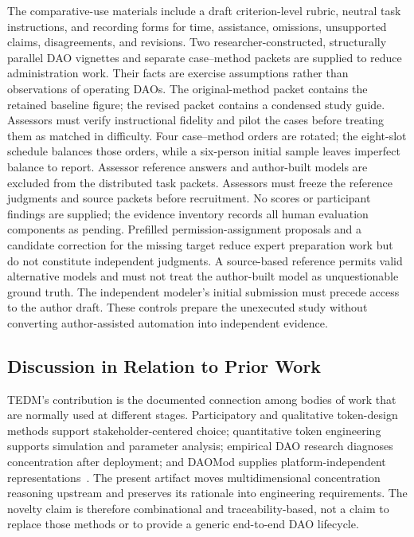 \documentclass[referee,sn-basic]{sn-jnl}
\begin{document}
The comparative-use materials include a draft criterion-level rubric, neutral
task instructions, and recording forms for time, assistance, omissions,
unsupported claims, disagreements, and revisions. Two researcher-constructed, structurally parallel DAO vignettes and separate
case--method packets are supplied to reduce administration work. Their facts
are exercise assumptions rather than observations of operating DAOs. The
original-method packet contains the retained baseline figure; the revised
packet contains a condensed study guide. Assessors must verify instructional
fidelity and pilot the cases before treating them as matched in difficulty.
Four case--method orders are rotated; the eight-slot schedule balances those
orders, while a six-person initial sample leaves imperfect balance to report.
Assessor reference answers and author-built models are excluded from the
distributed task packets. Assessors must freeze the
reference judgments and source packets before recruitment. No scores
or participant findings are supplied; the evidence inventory records all human
evaluation components as pending. Prefilled permission-assignment proposals
and a candidate correction for the missing target reduce expert preparation
work but do not constitute independent judgments. A source-based reference permits valid
alternative models and must not treat the author-built model as unquestionable
ground truth. The independent modeler's initial submission must precede access
to the author draft. These controls prepare the unexecuted study without
converting author-assisted automation into independent evidence.

\subsection{Discussion in Relation to Prior Work}
\label{subsec:evaluation-comparison}

TEDM's contribution is the documented connection among bodies of work that are
normally used at different stages. Participatory and qualitative token-design
methods support stakeholder-centered choice; quantitative token engineering
supports simulation and parameter analysis; empirical DAO research diagnoses
concentration after deployment; and DAOMod supplies platform-independent
representations~\cite{Domenicale2026Tokenomics,Sadykhov2025DeTEcT,
Fritsch2024VotingPower,Avanzo2026DAOMod}. The present artifact moves
multidimensional concentration reasoning upstream and preserves its rationale
into engineering requirements. The novelty claim is therefore combinational
and traceability-based, not a claim to replace those methods or to provide a
generic end-to-end DAO lifecycle.
\end{document}
